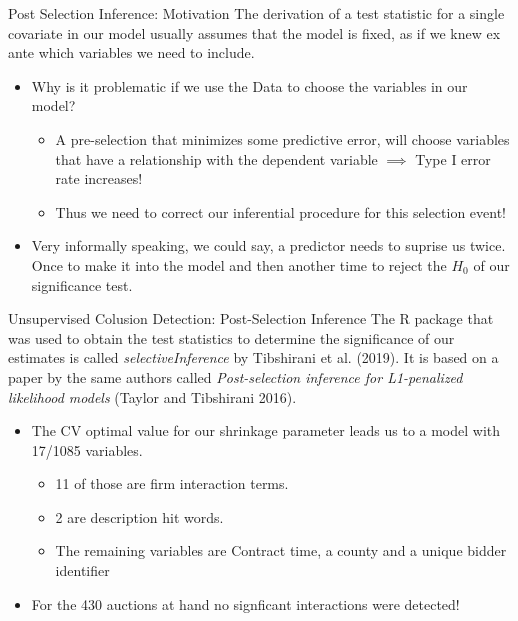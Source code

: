 \documentclass[
  11pt,
  ignorenonframetext,
]{beamer}
\providecommand{\tightlist}{%
  \setlength{\itemsep}{0pt}\setlength{\parskip}{0pt}}
\begin{document}
\begin{frame}{Post Selection Inference: Motivation}
\protect\hypertarget{post-selection-inference-motivation}{}
The derivation of a test statistic for a single covariate in our model
usually assumes that the model is fixed, as if we knew ex ante which
variables we need to include.

\begin{itemize}
\tightlist
\item
  Why is it problematic if we use the Data to choose the variables in
  our model?

  \begin{itemize}
  \tightlist
  \item
    A pre-selection that minimizes some predictive error, will choose
    variables that have a relationship with the dependent variable
    \(\implies\) Type I error rate increases!
  \item
    Thus we need to correct our inferential procedure for this selection
    event!
  \end{itemize}
\item
  Very informally speaking, we could say, a predictor needs to suprise
  us twice. Once to make it into the model and then another time to
  reject the \(H_0\) of our significance test.
\end{itemize}
\end{frame}

\begin{frame}{Unsupervised Colusion Detection: Post-Selection Inference}
\protect\hypertarget{unsupervised-colusion-detection-post-selection-inference}{}
The R package that was used to obtain the test statistics to determine
the significance of our estimates is called \textit{selectiveInference}
by Tibshirani et al. (2019). It is based on a paper by the same authors
called
\textit{Post-selection inference for L1-penalized likelihood models}
(Taylor and Tibshirani 2016).

\begin{itemize}
\tightlist
\item
  The CV optimal value for our shrinkage parameter leads us to a model
  with 17/1085 variables.

  \begin{itemize}
  \tightlist
  \item
    11 of those are firm interaction terms.
  \item
    2 are description hit words.
  \item
    The remaining variables are Contract time, a county and a unique
    bidder identifier
  \end{itemize}
\item
  For the 430 auctions at hand no signficant interactions were detected!
\end{itemize}
\end{frame}
\end{document}
